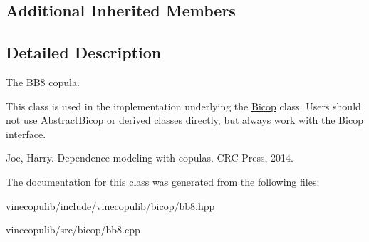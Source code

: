 \subsection*{Additional Inherited Members}


\subsection{Detailed Description}
The B\+B8 copula. 

This class is used in the implementation underlying the \hyperlink{classvinecopulib_1_1_bicop}{Bicop} class. Users should not use \hyperlink{classvinecopulib_1_1_abstract_bicop}{Abstract\+Bicop} or derived classes directly, but always work with the \hyperlink{classvinecopulib_1_1_bicop}{Bicop} interface.

Joe, Harry. Dependence modeling with copulas. C\+R\+C Press, 2014. 

The documentation for this class was generated from the following files\+:\begin{DoxyCompactItemize}
\item 
vinecopulib/include/vinecopulib/bicop/bb8.\+hpp\item 
vinecopulib/src/bicop/bb8.\+cpp\end{DoxyCompactItemize}
